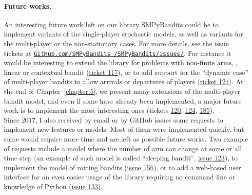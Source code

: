 {\paragraph{Future works.}
%
An interesting future work left on our library SMPyBandits could be to implement variants of the single-player stochastic models, as well as variants for the multi-player or the non-stationary cases.
For more details, see the issue tickets at \href{https://github.com/SMPyBandits/SMPyBandits/issues/}{\texttt{GitHub.com/SMPyBandits /SMPyBandits/issues/}}.
For instance it would be interesting to extend the library for problems with non-finite arms, \eg, linear or contextual bandit (\href{https://github.com/SMPyBandits/SMPyBandits/issues/117}{ticket 117}),
or to add support for the ``dynamic case'' of multi-player bandits to allow arrivals or departures of players (\href{https://github.com/SMPyBandits/SMPyBandits/issues/124}{ticket 124}).
%
At the end of Chapter~\ref{chapter:5}, we present many extensions of the multi-player bandit model,
and even if some have already been implemented, a major future work is to implement the most interesting ones
(tickets \href{https://github.com/SMPyBandits/SMPyBandits/issues/120}{120}, \href{https://github.com/SMPyBandits/SMPyBandits/issues/124}{124}, \href{https://github.com/SMPyBandits/SMPyBandits/issues/185}{185}).\\
%
\indent
Since $2017$, I also received by email or by GitHub issues some requests to implement new features or models. Most of them were implemented quickly, but some would require more time and are left as possible future works.
Two example of requests include a model where the number of arm can change at some or all time step (an example of such model is called ``sleeping bandit'', \href{https://github.com/SMPyBandits/SMPyBandits/issues/123}{issue 123}), to implement the model of rotting bandits (\href{https://github.com/SMPyBandits/SMPyBandits/issues/156}{issue 156}), or to add a web-based user interface for an even easier usage of the library requiring no command line or knowledge of Python (\href{https://github.com/SMPyBandits/SMPyBandits/issues/133}{issue 133}).


}
